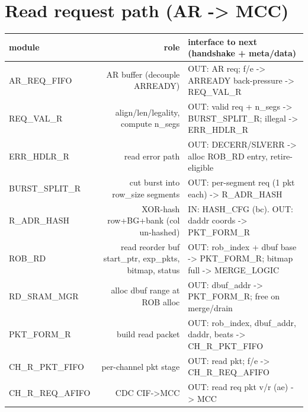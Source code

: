 \documentclass[9pt]{extarticle}
\newenvironment{flow}{%
  \footnotesize\rowcolors{2}{white}{zeb}\begin{longtable}{M R I}
  \rowcolor{hb}\textbf{module} & \textbf{role} & \textbf{interface to next (handshake + meta/data)}\\ \midrule\endhead}
  {\bottomrule\end{longtable}}
\begin{document}
\section{Read request path  \textcolor{headbg}{(AR -> MCC)}}
\begin{flow}
AR_REQ_FIFO & AR buffer (decouple ARREADY) & OUT: AR req;  f/e -> ARREADY back-pressure -> REQ_VAL_R\\
REQ_VAL_R & align/len/legality, compute n_segs & OUT: valid req + n_segs -> BURST_SPLIT_R;  illegal -> ERR_HDLR_R\\
ERR_HDLR_R & read error path & OUT: DECERR/SLVERR -> alloc ROB_RD entry, retire-eligible\\
BURST_SPLIT_R & cut burst into row_size segments & OUT: per-segment req (1 pkt each) -> R_ADR_HASH\\
R_ADR_HASH & XOR-hash row+BG+bank (col un-hashed) & IN: HASH_CFG (bc). OUT: daddr coords -> PKT_FORM_R\\
ROB_RD & read reorder buf {start_ptr, exp_pkts, bitmap, status} & OUT: rob_index + dbuf base -> PKT_FORM_R;  bitmap full -> MERGE_LOGIC\\
RD_SRAM_MGR & alloc dbuf range at ROB alloc & OUT: dbuf_addr -> PKT_FORM_R;  free on merge/drain\\
PKT_FORM_R & build read packet & OUT: {rob_index, dbuf_addr, daddr, beats} -> CH_R_PKT_FIFO\\
CH_R_PKT_FIFO & per-channel pkt stage & OUT: read pkt;  f/e -> CH_R_REQ_AFIFO\\
CH_R_REQ_AFIFO & CDC CIF->MCC & OUT: read req pkt  v/r (ae) -> MCC\\
\end{flow}
\end{document}
